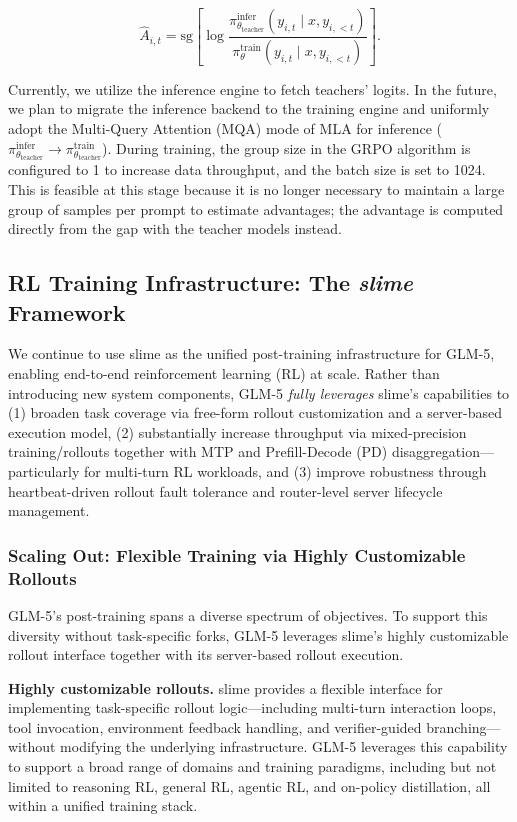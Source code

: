 \begin{equation}
    \hat{A}_{i,t} = \text{sg}\left[\log\frac{\pi_{\theta_{\text{teacher}}}^{\text{infer}}(y_{i,t}\mid x,y_{i,<t})}{\pi_\theta^{\text{train}}(y_{i,t}\mid x,y_{i,<t})}\right].
\end{equation}

Currently, we utilize the inference engine to fetch teachers' logits. In the future, we plan to migrate the inference backend to the training engine and uniformly adopt the Multi-Query Attention (MQA) mode of MLA for inference ($\pi_{\theta_{\text{teacher}}}^{\text{infer}}\rightarrow\pi_{\theta_{\text{teacher}}}^{\text{train}}$).
During training, the group size in the GRPO algorithm is configured to 1 to increase data throughput, and the batch size is set to 1024. This is feasible at this stage because it is no longer necessary to maintain a large group of samples per prompt to estimate advantages; the advantage is computed directly from the gap with the teacher models instead.

\subsection{RL Training Infrastructure: The \emph{slime} Framework}

We continue to use slime as the unified post-training infrastructure for GLM-5, enabling end-to-end reinforcement learning (RL) at scale. Rather than introducing new system components, GLM-5 \emph{fully leverages} slime's capabilities to (1) broaden task coverage via free-form rollout customization and a server-based execution model, (2) substantially increase throughput via mixed-precision training/rollouts together with MTP and Prefill-Decode (PD) disaggregation---particularly for multi-turn RL workloads, and (3) improve robustness through heartbeat-driven rollout fault tolerance and router-level server lifecycle management.

\subsubsection{Scaling Out: Flexible Training via Highly Customizable Rollouts}
GLM-5’s post-training spans a diverse spectrum of objectives. To support this diversity without task-specific forks, GLM-5 leverages slime's highly customizable rollout interface together with its server-based rollout execution.

\textbf{Highly customizable rollouts.} slime provides a flexible interface for implementing task-specific rollout logic---including multi-turn interaction loops, tool invocation, environment feedback handling, and verifier-guided branching---without modifying the underlying infrastructure. GLM-5 leverages this capability to support a broad range of domains and training paradigms, including but not limited to reasoning RL, general RL, agentic RL, and on-policy distillation, all within a unified training stack.

